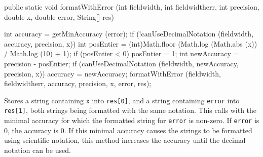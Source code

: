 \begin{htmlonly}
\end{htmlonly}
\begin{code}

   public static void formatWithError (int fieldwidth, int fieldwidtherr,
          int precision, double x, double error, String[] res)\begin{hide} {
      int accuracy = getMinAccuracy (error);
      if (!canUseDecimalNotation (fieldwidth, accuracy, precision, x)) {
         int posEntier = (int)Math.floor (Math.log (Math.abs (x)) / Math.log (10) + 1);
         if (posEntier < 0)
            posEntier = 1;
         int newAccuracy = precision - posEntier;
         if (canUseDecimalNotation (fieldwidth, newAccuracy, precision, x))
            accuracy = newAccuracy;
      }
      formatWithError (fieldwidth, fieldwidtherr, accuracy, precision, x, error, res);
   }\end{hide}
\end{code}
\begin{tabb}
   Stores a string containing \texttt{x} into \texttt{res[0]}, and
   a string containing \texttt{error} into \texttt{res[1]}, both strings being
   formatted with the same notation.
   This calls  with
   the minimal accuracy for which the formatted string for \texttt{error} is non-zero.
   If \texttt{error} is 0, the accuracy is 0.
   If this minimal accuracy causes the strings to be formatted using scientific
   notation, this method increases the accuracy until the decimal notation can be used.
\end{tabb}
\begin{htmlonly}
\end{htmlonly}
